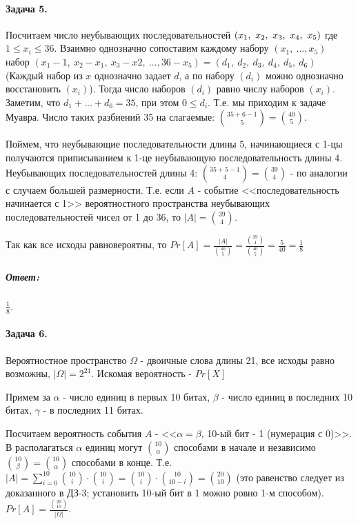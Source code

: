 \documentclass{article}
\begin{document}
 	\paragraph{Задача 5.}
 	Посчитаем число неубывающих последовательностей $\linebreak (x_1,\ x_2,\ x_3,\ x_4,\ x_5)$ где $1 \leqslant x_i \leqslant 36$. Взаимно однозначно сопоставим каждому набору  $(x_1,\ ...,x_5)$  набор $(x_1 - 1,\ x_2 - x_1,\ x_3 - x2,\ ..., 36 - x_5) = (d_1,\ d_2,\ d_3,\ d_4,\ d_5,\ d_6)$ (Каждый набор из $x$ однозначно задает $d$, а по набору $(d_i)$ можно однозначно восстановить $(x_i)$). Тогда число наборов $(d_i)$ равно числу наборов $(x_i)$. Заметим, что $d_1 + ... + d_6 = 35$, при этом $0 \leqslant d_i$. Т.е. мы приходим к задаче Муавра. Число таких разбиений 35 на слагаемые: ${35 + 6 - 1 \choose 5} = {40 \choose 5}$.
 	
 	Поймем, что  неубывающие последовательности длины 5, начинающиеся с 1-цы получаются приписыванием к 1-це неубывающую последовательность длины 4. Неубывающих последовательностей длины 4: ${35 + 5 - 1 \choose 4} = {39 \choose 4}$ - по аналогии с случаем большей размерности. Т.е. если $A$ - событие <<последовательность начинается с 1>> вероятностного пространства неубывающих последовательностей чисел от 1 до 36, то $|A| = {39 \choose 4}$. 
 	
 	Так как все исходы равновероятны, то $Pr[A] = \frac{|A|}{{40 \choose 5}} = \frac{{39 \choose 4}}{{40 \choose 5}} = \frac{5}{40} = \frac{1}{8}$
 
 	\subparagraph{Ответ:} $\frac{1}{8}$.
 	
 	\paragraph{Задача 6.}
 	Вероятностное пространство $\Omega$ - двоичные слова длины 21, все исходы равно возможны, $|\Omega| = 2^{21}$. Искомая вероятность - $Pr[X]$
 	
 	Примем за $\alpha$ - число единиц в первых 10 битах, $\beta$ - число единиц в последних 10 битах, $\gamma$ - в последних 11 битах.
 	
 	Посчитаем вероятность события $A$ - <<$\alpha = \beta$, 10-ый бит - 1 (нумерация с 0)>>. В располагаться $\alpha$ единиц могут ${10 \choose \alpha}$ способами в начале и независимо ${10 \choose \beta} = {10 \choose \alpha}$ способами в конце. Т.е. $|A| = \sum_{i=0}^{10} {10 \choose i} \cdot {10 \choose i} = {10 \choose i} \cdot {10 \choose 10 - i} = {20 \choose 10}$ (это равенство следует из доказанного в ДЗ-3; установить 10-ый бит в 1 можно ровно 1-м способом). $Pr[A] = \frac{{20 \choose 10}}{|\Omega|}$.
 	
\end{document}
